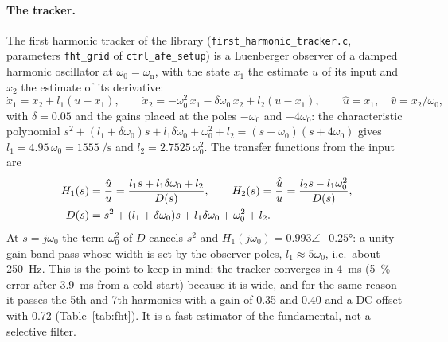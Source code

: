 \documentclass[11pt,a4paper]{scrartcl}
\newcommand{\ped}[1]{_{\mathrm{#1}}}
\newcommand{\code}[1]{\texttt{#1}}
\begin{document}
\begin{onehalfspace}
\paragraph{The tracker.} The first harmonic tracker of the library (\code{first\_harmonic\_tracker.c}, parameters \code{fht\_grid} of \code{ctrl\_afe\_setup}) is a Luenberger observer of a damped harmonic oscillator at $\omega_0 = \omega\ped{n}$, with the state $x_1$ the estimate $\hat u$ of its input and $x_2$ the estimate of its derivative:
\begin{equation}
	\dot x_1 = x_2 + l_1 (u - x_1), \qquad \dot x_2 = -\omega_0^2\, x_1 - \delta\omega_0\, x_2 + l_2 (u - x_1), \qquad \hat u = x_1, \quad \hat v = x_2/\omega_0,
	\label{eq:fht}
\end{equation}
with $\delta = 0.05$ and the gains placed at the poles $-\omega_0$ and $-4\omega_0$: the characteristic polynomial $s^2 + (l_1 + \delta\omega_0)s + l_1\delta\omega_0 + \omega_0^2 + l_2 = (s+\omega_0)(s+4\omega_0)$ gives $l_1 = 4.95\,\omega_0 = \SI{1555}{\per\second}$ and $l_2 = 2.7525\,\omega_0^2$. The transfer functions from the input are
\begin{align}
	H_1(s) &= \frac{\hat u}{u} = \frac{l_1 s + l_1\delta\omega_0 + l_2}{D(s)}, \qquad
	H_2(s) = \frac{\hat{\dot u}}{u} = \frac{l_2 s - l_1\omega_0^2}{D(s)}, \notag \\
	D(s) &= s^2 + (l_1+\delta\omega_0)s + l_1\delta\omega_0 + \omega_0^2 + l_2.
	\label{eq:H12}
\end{align}
At $s = j\omega_0$ the term $\omega_0^2$ of $D$ cancels $s^2$ and $H_1(j\omega_0) = 0.993\angle\ang{-0.25}$: a unity-gain band-pass whose width is set by the observer poles, $l_1 \approx 5\omega_0$, i.e.\ about \SI{250}{\hertz}. This is the point to keep in mind: the tracker converges in \SI{4}{\milli\second} (\num{5}~\% error after \SI{3.9}{\milli\second} from a cold start) because it is wide, and for the same reason it passes the 5th and 7th harmonics with a gain of \num{0.35} and \num{0.40} and a DC offset with \num{0.72} (Table~\ref{tab:fht}). It is a fast estimator of the fundamental, not a selective filter.


\end{onehalfspace}
\end{document}
